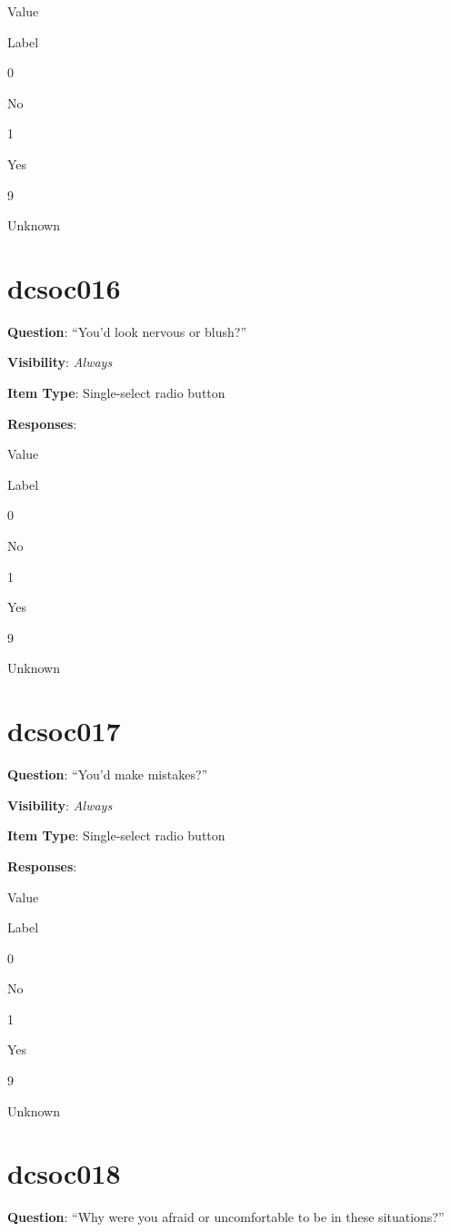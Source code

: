 \documentclass[]{book}
\begin{document}
Value

Label

0

No

1

Yes

9

Unknown

\hypertarget{dcsoc016}{%
\section{dcsoc016}\label{dcsoc016}}

\textbf{Question}: ``You'd look nervous or blush?''

\textbf{Visibility}: \emph{Always}

\textbf{Item Type}: Single-select radio button

\textbf{Responses}:

Value

Label

0

No

1

Yes

9

Unknown

\hypertarget{dcsoc017}{%
\section{dcsoc017}\label{dcsoc017}}

\textbf{Question}: ``You'd make mistakes?''

\textbf{Visibility}: \emph{Always}

\textbf{Item Type}: Single-select radio button

\textbf{Responses}:

Value

Label

0

No

1

Yes

9

Unknown

\hypertarget{dcsoc018}{%
\section{dcsoc018}\label{dcsoc018}}

\textbf{Question}: ``Why were you afraid or uncomfortable to be in these situations?''
\end{document}

